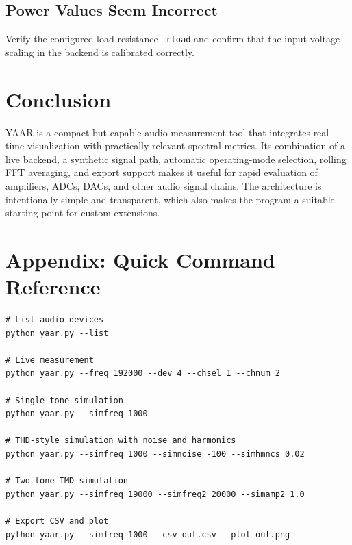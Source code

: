 \documentclass[conference]{IEEEtran}
\begin{document}
\subsection{Power Values Seem Incorrect}
Verify the configured load resistance \texttt{--rload} and confirm that the input voltage scaling in the backend is calibrated correctly.

\section{Conclusion}
YAAR is a compact but capable audio measurement tool that integrates real-time visualization with practically relevant spectral metrics. Its combination of a live backend, a synthetic signal path, automatic operating-mode selection, rolling FFT averaging, and export support makes it useful for rapid evaluation of amplifiers, ADCs, DACs, and other audio signal chains. The architecture is intentionally simple and transparent, which also makes the program a suitable starting point for custom extensions.

\section*{Appendix: Quick Command Reference}
\begin{lstlisting}[style=shellstyle]
# List audio devices
python yaar.py --list

# Live measurement
python yaar.py --freq 192000 --dev 4 --chsel 1 --chnum 2

# Single-tone simulation
python yaar.py --simfreq 1000

# THD-style simulation with noise and harmonics
python yaar.py --simfreq 1000 --simnoise -100 --simhmncs 0.02

# Two-tone IMD simulation
python yaar.py --simfreq 19000 --simfreq2 20000 --simamp2 1.0

# Export CSV and plot
python yaar.py --simfreq 1000 --csv out.csv --plot out.png
\end{lstlisting}
\end{document}
